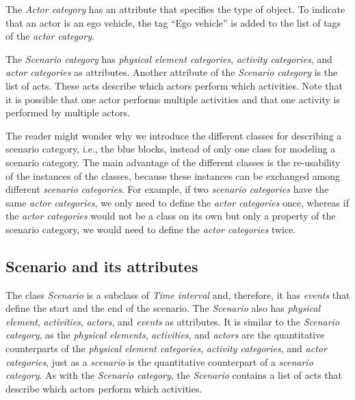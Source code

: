The \textit{Actor category} has an attribute that specifies the type of object.
To indicate that an actor is an ego vehicle, the tag ``Ego vehicle'' is added to the list of tags of the \textit{actor category}.

The \textit{Scenario category} has \cstarte \textit{physical element categories}\cende, \textit{activity categories}, and \textit{actor categories} as attributes. 
Another attribute of the \textit{Scenario category} is the list of acts. %
These acts describe which actors perform which activities. Note that it is possible that one actor performs multiple activities and that one activity is performed by multiple actors.

The reader might wonder why we introduce the different classes for describing a scenario category, i.e., the blue blocks, instead of only one class for modeling a scenario category. 
The main advantage of the different classes is the re-usability of the instances of the classes, because these instances can be exchanged among different \textit{scenario categories}. For example, if two \textit{scenario categories} have the same \textit{actor categories}, we only need to define the \textit{actor categories} once, whereas if the \textit{actor categories} would not be a class on its own but only a property of the scenario category, we would need to define the \textit{actor categories} twice.



\subsection{Scenario and its attributes}
\label{sec:domain scenario}

\cstartb The class \textit{Scenario} is a subclass of \textit{Time interval} and, therefore, it has \textit{events} that define the start and the end of the scenario. \cendb
The \textit{Scenario} also has \cstarte\textit{physical element}\cende, \textit{activities}, \textit{actors}, and \textit{events} as attributes. 
It is similar to the \textit{Scenario category}, as the \cstarte\textit{physical elements}\cende, \textit{activities}, and \textit{actors} are the quantitative counterparts of the \cstarte\textit{physical element categories}\cende, \textit{activity categories}, \cendb and \textit{actor categories}, just as a \textit{scenario} is the quantitative counterpart of a \textit{scenario category}. 
As with the \textit{Scenario category}, the \textit{Scenario} contains a list of acts that describe which actors perform which activities.

